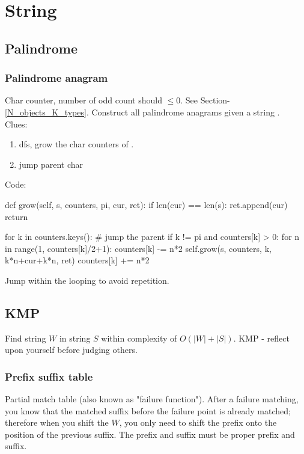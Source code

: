 \chapter{String}

\section{Palindrome}
\subsection{Palindrome anagram}
 Char counter, number of odd count should $\leq 0$.
 See Section-\ref{N_objects_K_types}.
 Construct all palindrome anagrams given a string .
\\
Clues:
\begin{enumerate}
\item dfs, grow the char counters of . 
\item jump parent char
\end{enumerate}
Code:
\begin{python}
def grow(self, s, counters, pi, cur, ret):
  if len(cur) == len(s):
    ret.append(cur)
    return

  for k in counters.keys():
    # jump the parent
    if k != pi and counters[k] > 0:
      for n in range(1, counters[k]/2+1):
        counters[k] -= n*2
        self.grow(s, counters, k, k*n+cur+k*n, ret)
        counters[k] += n*2
\end{python}

Jump within the looping to avoid repetition. 

\section{KMP}
Find string $W$ in string $S$ within complexity of $O(|W|+|S|)$. KMP - reflect upon yourself before judging others.
\subsection{Prefix suffix table}
Partial match table (also known as "failure function"). After a failure matching, you know that the matched suffix before the failure point is already matched; therefore when you shift the $W$, you only need to shift the prefix onto the position of the previous suffix. The prefix and suffix must be proper prefix and suffix.

